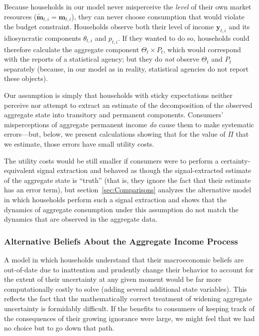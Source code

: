 \documentclass[titlepage]{article}
\begin{document}
Because households in our model never misperceive the \textit{level} of their own market resources ($\widetilde{\mathbf{m}}_{t,i}=\mathbf{m}_{t,i}$), they can never choose consumption that would violate the budget constraint.  Households observe both their level of income $\mathbf{y}_{t,i}$ and its idiosyncratic components $\theta_{t,i}$ and ${p}_{t,i}$. If they wanted to do so, households could therefore calculate the aggregate component $\Theta_{t}\times {P}_{t}$, which would correspond with the reports of a statistical agency; but they do \textit{not} observe $\Theta_{t}$ and ${P}_{t}$ separately (because, in our model as in reality, statistical agencies do not report these objects).

Our assumption is simply that households with sticky expectations neither perceive nor attempt to extract an estimate of the decomposition of the observed aggregate state into transitory and permanent components.  Consumers' misperceptions of aggregate permanent income \textit{do} cause them to make systematic errors---but, below, we present calculations showing that for the value of $\Pi$ that we estimate, those errors have small utility costs.

The utility costs would be still smaller if consumers were to perform a certainty-equivalent signal extraction and behaved as though the signal-extracted estimate of the aggregate state is ``truth'' (that is, they ignore the fact that their estimate has an error term), but section~\ref{sec:Comparisons} analyzes the alternative model in which households perform such a signal extraction and shows that the dynamics of aggregate consumption under this assumption do not match the dynamics that are observed in the aggregate data.

\subsubsection{Alternative Beliefs About the Aggregate Income Process}
A model in which households understand that their macroeconomic beliefs are out-of-date due to inattention and prudently change their behavior to account for the extent of their uncertainty at any given moment would be far more computationally costly to solve (adding several additional state variables).  This reflects the fact that the mathematically correct treatment of widening aggregate uncertainty is formidably difficult.  If the benefits to consumers of keeping track of the consequences of their growing ignorance were large, we might feel that we had no choice but to go down that path.
\end{document}
